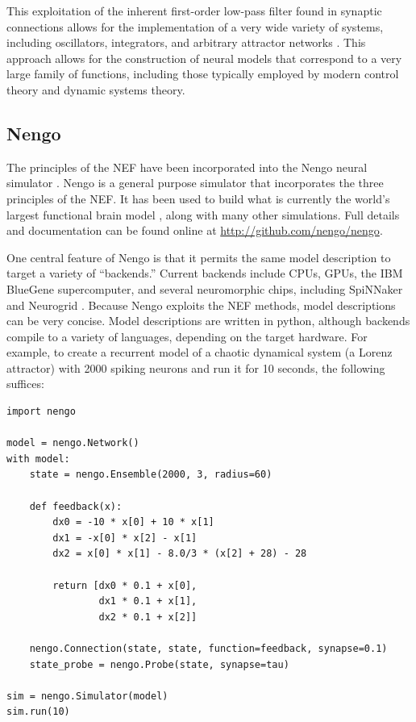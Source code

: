 \documentclass[english]{article}
\begin{document}
This exploitation of the inherent first-order low-pass filter found
in synaptic connections allows for the implementation of a very wide
variety of systems, including oscillators, integrators, and arbitrary
attractor networks \cite{Eliasmith2005p}. 
This approach allows for the construction of neural models that correspond
to a very large family of functions, including those typically employed
by modern control theory and dynamic systems theory.

\subsection{Nengo}

The principles of the NEF have been incorporated into the Nengo neural simulator \cite{Bekolay2014}.  Nengo is a general purpose simulator that incorporates the three principles of the NEF.  It has been used to build what is currently the world's largest functional brain model \cite{Eliasmith2012b}, along with many other simulations. Full details and documentation can be found online at \url{http://github.com/nengo/nengo}.

One central feature of Nengo is that it permits the same model description to target a variety of ``backends.''  Current backends include CPUs, GPUs, the IBM BlueGene supercomputer, and several neuromorphic chips, including SpiNNaker \cite{Khan2008} and Neurogrid \cite{Choudhary2012}.  Because Nengo exploits the NEF methods, model descriptions can be very concise.  Model descriptions are written in python, although backends compile to a variety of languages, depending on the target hardware. For example, to create a recurrent model of a chaotic dynamical system (a Lorenz attractor) with 2000 spiking neurons and run it for 10 seconds, the following suffices:

\begin{verbatim}
import nengo

model = nengo.Network()
with model:
    state = nengo.Ensemble(2000, 3, radius=60)
	
	def feedback(x):
	    dx0 = -10 * x[0] + 10 * x[1]
	    dx1 = -x[0] * x[2] - x[1]
	    dx2 = x[0] * x[1] - 8.0/3 * (x[2] + 28) - 28
	
	    return [dx0 * 0.1 + x[0],
	            dx1 * 0.1 + x[1],
	            dx2 * 0.1 + x[2]]
	                
    nengo.Connection(state, state, function=feedback, synapse=0.1)
    state_probe = nengo.Probe(state, synapse=tau)
    
sim = nengo.Simulator(model)
sim.run(10)
\end{verbatim}
\end{document}
